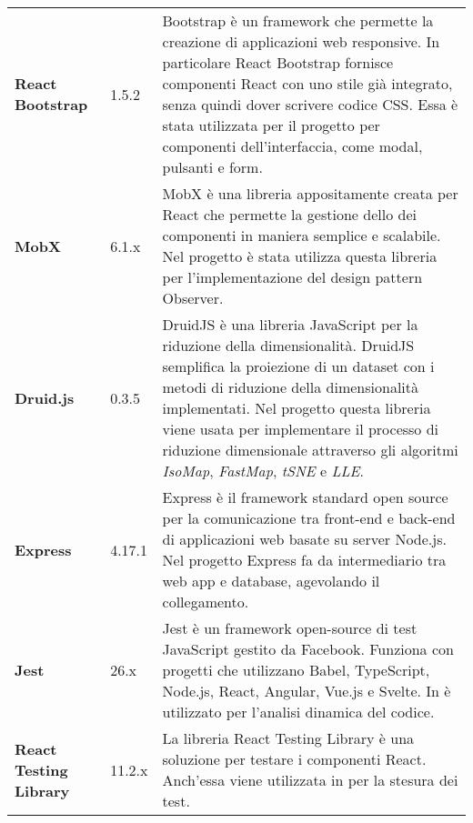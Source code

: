 {\begin{longtable}{C{3cm} C{2cm} C{10cm}}
	\textbf{React Bootstrap} & 
	1.5.2 &
	Bootstrap è un framework che permette la creazione di applicazioni web responsive. In particolare React Bootstrap fornisce componenti React con uno stile già integrato, senza quindi dover scrivere codice CSS. Essa è stata utilizzata per il progetto per componenti dell'interfaccia, come modal, pulsanti e form.\\
		
	\textbf{MobX} & 
	6.1.x &
	MobX è una libreria appositamente creata per React che permette la gestione dello  dei componenti in maniera semplice e scalabile. Nel progetto \NomeProgetto{} è stata utilizza questa libreria per l'implementazione del design pattern Observer.\\
	
	\textbf{Druid.js} & 
	0.3.5 &
	DruidJS è una libreria JavaScript per la riduzione della dimensionalità. DruidJS semplifica la proiezione di un dataset con i metodi di riduzione della dimensionalità implementati.
Nel progetto \NomeProgetto{} questa libreria viene usata per implementare il processo di riduzione dimensionale attraverso gli algoritmi \textit{IsoMap}, \textit{FastMap}, \textit{tSNE} e \textit{LLE}.\\

	\textbf{Express} & 
	4.17.1 &
	Express è il framework standard open source per la comunicazione tra front-end e back-end di applicazioni web basate su server Node.js. 
Nel progetto \NomeProgetto{} Express fa da intermediario tra web app e database, agevolando il collegamento.\\

	\textbf{Jest} & 
	26.x &
	Jest è un framework open-source di test JavaScript gestito da Facebook. Funziona con progetti che utilizzano Babel, TypeScript, Node.js, React, Angular, Vue.js e Svelte. In \NomeProgetto{} è utilizzato per l'analisi dinamica del codice.\\

	\textbf{React Testing Library} & 
	11.2.x &
	La libreria React Testing Library è una soluzione per testare i componenti React. Anch'essa viene utilizzata in \NomeProgetto{} per la stesura dei test.\\
\end{longtable}	
}



